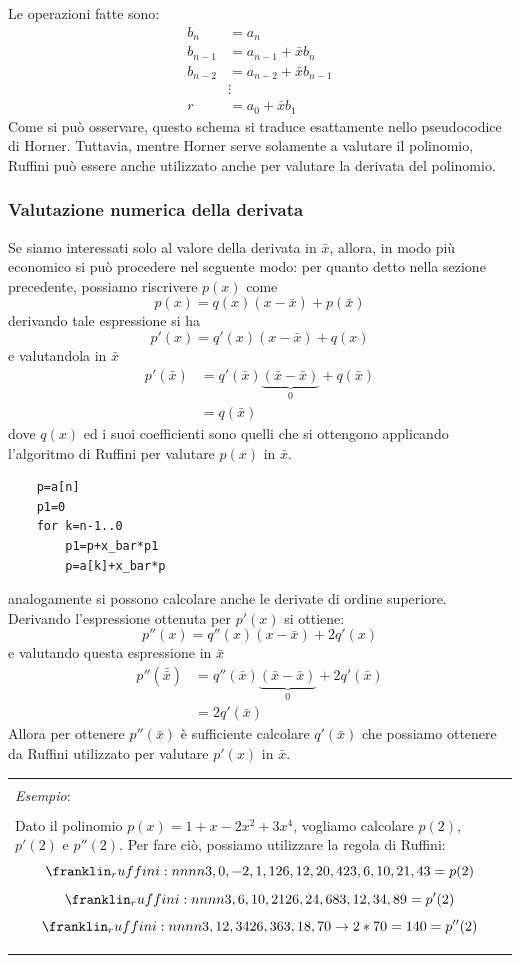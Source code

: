 \documentclass{article}
\numberwithin{equation}{section}
\newenvironment{example}
{\begin{center}
        \begin{tabular}{|p{0.9\textwidth}|}
            \hline \\ 
            \textit{Esempio}: \\\\ 
        }
        {
            \\\\ \hline
        \end{tabular}
    \end{center}
}
\begin{document}
Le operazioni fatte sono:
\begin{equation*}
   \begin{aligned}
    b_n & = a_n \\
    b_{n-1} & = a_{n-1}+\bar{x}b_n \\
    b_{n-2} & = a_{n-2}+\bar{x}b_{n-1} \\
    & \vdots \\
    r & = a_0+\bar{x}b_1
   \end{aligned} 
\end{equation*}
Come si può osservare, questo schema si traduce esattamente nello pseudocodice
di Horner. Tuttavia, mentre Horner serve solamente a valutare il polinomio,
Ruffini può essere anche utilizzato anche per valutare la derivata del polinomio.
\subsubsection{Valutazione numerica della derivata}
Se siamo interessati solo al valore della derivata in $\bar{x}$, allora, 
in modo più economico si può procedere nel seguente modo: 
per quanto detto nella sezione precedente, possiamo riscrivere
$p(x)$ come
$$p(x)=q(x)(x-\bar{x})+p(\bar{x})$$
derivando tale espressione si ha 
$$p'(x)=q'(x)(x-\bar{x})+q(x)$$
e valutandola in $\bar{x}$
\begin{equation*}
    \begin{aligned}
        p'(\bar{x})&=q'(\bar{x})\underbrace{(\bar{x}-\bar{x})}_{0}+q(\bar{x})\\ 
                   &=q(\bar{x})
    \end{aligned} 
\end{equation*}
dove $q(x)$ ed i suoi coefficienti sono quelli che si ottengono applicando
l'algoritmo di Ruffini per valutare $p(x)$ in $\bar{x}$.
\begin{verbatim}
    p=a[n]
    p1=0
    for k=n-1..0
        p1=p+x_bar*p1
        p=a[k]+x_bar*p
\end{verbatim}
analogamente si possono calcolare anche le derivate di ordine superiore.
Derivando l'espressione ottenuta per $p'(x)$ si ottiene:
$$p''(x)=q''(x)(x-\bar{x})+2q'(x)$$
e valutando questa espressione in $\bar{x}$
\begin{equation*}
   \begin{aligned}
       p''(\bar{\bar{x}})&=q''(\bar{x})\underbrace{(\bar{x}-\bar{x})}_0+2q'(\bar{x})\\
       &=2q'(\bar{x})
   \end{aligned} 
\end{equation*}
Allora per ottenere $p''(\bar{x})$ è sufficiente calcolare $q'(\bar{x})$ che
possiamo ottenere da Ruffini utilizzato per valutare $p'(x)$ in $\bar{x}$.
\begin{example}
    Dato il polinomio $p(x)=1+x-2x^2+3x^4$, vogliamo calcolare $p(2)$, $p'(2)$
    e $p''(2)$.
    Per fare ciò, possiamo utilizzare la regola di Ruffini:
    $$\ruffini{3,0,-2,1,1}{2}{6,12,20,42}{3,6,10,21,43=p(2)}$$
    $$\ruffini{3,6,10,21}{2}{6,24,68}{3,12,34,89=p'(2)}$$
    $$\ruffini{3,12,34}{2}{6,36}{3,18,70\rightarrow 2*70=140=p''(2)}$$
\end{example}
\end{document}
